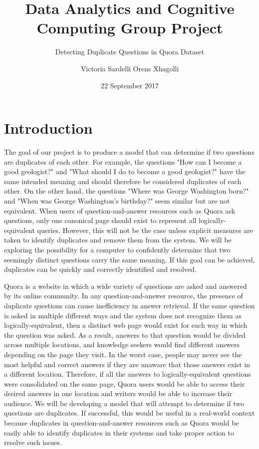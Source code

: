 \documentclass{sig-alternate}
\begin{document}
\title{Data Analytics and Cognitive Computing Group Project}
\subtitle{Detecting Duplicate Questions in Quora Dataset}
\author{
\alignauthor
Victoria Sardelli
\alignauthor
Orens Xhagolli
}
\date{22 September 2017}
\maketitle

\section{Introduction}
\label{introduction}
The goal of our project is to produce a model that can determine if two questions are duplicates of each other. For example, the questions "How can I become a good geologist?" and "What should I do to become a good geologist?" have the same intended meaning and should therefore be considered duplicates of each other. On the other hand, the questions "Where was George Washington born?" and "When was George Washington's birthday?" seem similar but are not equivalent. When users of question-and-answer resources such as Quora ask questions, only one canonical page should exist to represent all logically-equivalent queries. However, this will not be the case unless explicit measures are taken to identify duplicates and remove them from the system. We will be exploring the possibility for a computer to confidently determine that two seemingly distinct questions carry the same meaning. If this goal can be achieved, duplicates can be quickly and correctly identified and resolved. 

Quora is a website in which a wide variety of questions are asked and answered by its online community. In any question-and-answer resource, the presence of duplicate questions can cause inefficiency in answer retrieval. If the same question is asked in multiple different ways and the system does not recognize them as logically-equivalent, then a distinct web page would exist for each way in which the question was asked. As a result, answers to that question would be divided across multiple locations, and knowledge seekers would find different answers depending on the page they visit. In the worst case, people may never see the most helpful and correct answers if they are unaware that those answers exist in a different location. Therefore, if all the answers to logically-equivalent questions were consolidated on the same page, Quora users would be able to access their desired answers in one location and writers would be able to increase their audience. We will be developing a model that will attempt to determine if two questions are duplicates. If successful, this would be useful in a real-world context because duplicates in question-and-answer resources such as Quora would be easily able to identify duplicates in their systems and take proper action to resolve such issues.
\end{document}
